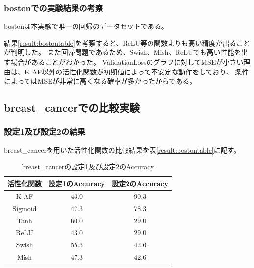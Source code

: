 \subsubsection{bostonでの実験結果の考察}
bostonは本実験で唯一の回帰のデータセットである。

結果\ref{result:bostontable}を考察すると、ReLU等の関数よりも高い精度が出ることが判明した。
また回帰問題であるため、Swish、Mish、ReLUでも高い性能を出す場合があることがわかった。
ValidationLossのグラフに対してMSEが小さい理由は、K-AF以外の活性化関数が初期値によって不安定な動作をしており、
条件によってはMSEが非常に高くなる確率が多かったからである。





\subsection{breast\_cancerでの比較実験}
\label{ev:breastcancer}

\subsubsection{設定1及び設定2の結果}

breast\_cancerを用いた活性化関数の比較結果を表\ref{result:bostontable}に記す。


\begin{table}[htbp]
    \begin{center}
        \caption{breast\_cancerの設定1及び設定2のAccuracy}
        \label{result:breastcancer}
        \vspace{2mm} 
        \begin{tabular}{|c|c|c|}
            \hline
            活性化関数              & 設定1のAccuracy &  設定2のAccuracy \\
            \hline
            K-AF            & 43.0 & 90.3 \\
            \hline
            Sigmoid            & 47.3 & 78.3\\
            \hline
            Tanh            & 60.0 & 29.0\\
            \hline
            ReLU        & 43.0 & 29.0\\
            \hline
            Swish           & 55.3 & 42.6\\
            \hline
            Mish           & 47.3 & 42.6\\
            \hline
        \end{tabular}
    \end{center}
\end{table}




